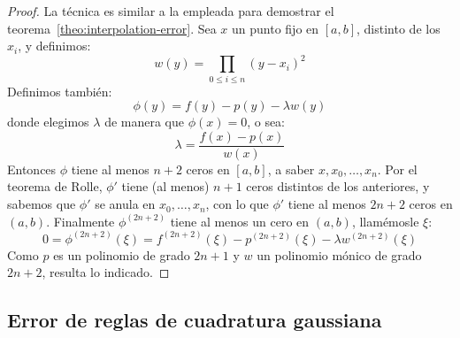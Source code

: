   \begin{proof}
    La técnica es similar a la empleada
    para demostrar el teorema~\ref{theo:interpolation-error}.
    Sea \(x\) un punto fijo en	\([a, b]\),
    distinto de los \(x_i\),
    y definimos:
    \begin{equation*}
      w(y)
        = \prod_{0 \le i \le n} (y - x_i)^2
    \end{equation*}
    Definimos también:
    \begin{equation*}
      \phi(y)
        = f(y) - p(y) - \lambda w(y)
    \end{equation*}
    donde elegimos \(\lambda\) de manera que \(\phi(x) = 0\),
    o sea:
    \begin{equation*}
      \lambda
        = \frac{f(x) - p(x)}{w(x)}
    \end{equation*}
    Entonces \(\phi\) tiene al menos \(n + 2\) ceros en \([a, b]\),
    a saber \(x, x_0, \dotsc, x_n\).
    Por el teorema de Rolle,
    \(\phi'\) tiene (al menos) \(n + 1\) ceros distintos de los anteriores,
    y sabemos que \(\phi'\) se anula en \(x_0, \dotsc, x_n\),
    con lo que \(\phi'\) tiene al menos \(2 n + 2\) ceros en \((a, b)\).
    Finalmente \(\phi^{(2 n + 2)}\) tiene al menos un cero en \((a,  b)\),
    llamémosle \(\xi\):
    \begin{equation*}
      0
        = \phi^{(2 n + 2)}(\xi)
        = f^{(2 n + 2)}(\xi) - p^{(2 n + 2)}(\xi) - \lambda w^{(2 n + 2)}(\xi)
    \end{equation*}
    Como \(p\) es un polinomio de grado \(2 n + 1\)
    y \(w\) un polinomio mónico de grado \(2 n + 2\),
    resulta lo indicado.
  \end{proof}

\subsection{Error de reglas de cuadratura gaussiana}
\label{sec:error-integracion-gaussiana}

